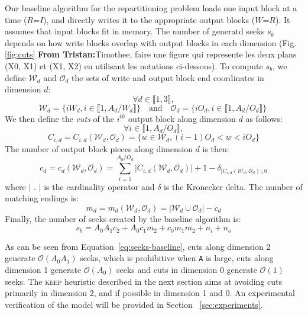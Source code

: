 \documentclass[sigconf, nonacm]{acmart}
\newcommand{\tristan}[1]{\color{orange}\textbf{From Tristan:}#1\color{black}}
\newcommand{\keep}[0]{\textsc{keep}\xspace}
\begin{document}
Our baseline algorithm for the repartitioning problem loads one input block
at a time ($R$=$I$), and directly writes it to the appropriate output
blocks ($W$=$R$). It assumes that input blocks fit in memory. The number of
generatd seeks $s_b$
depends on how write blocks overlap with
output blocks in each dimension (Fig.\ref{fig:cuts} \tristan{Timothee, faire une figure 
qui represente les deux plans (X0, X1) et (X1, X2) en utilisant les notations ci-dessous}). To compute $s_b$, we define
$\mathcal{W}_d$ and $\mathcal{O}_d$ the sets of write and output block end
coordinates in dimension $d$:
\[
  \forall d \in \llbracket 1, 3 \rrbracket,
\]
\begin{equation}
  \mathcal{W}_d = \Big\{ iW_d, i \in \llbracket 1, A_d/W_d \rrbracket \Big\} \quad \mathrm{and} \quad
  \mathcal{O}_d = \Big\{ iO_d, i \in \llbracket 1, A_d/O_d \rrbracket \Big\} ~\label{eq:baseline-blocks}
\end{equation}
We then define the \emph{cuts} of the $i^{th}$ output block along dimension
$d$ as follows:
\[
  \forall i \in \llbracket 1, A_d/O_d \rrbracket,
\]
\[
  C_{i, d} = C_{i, d}\left(  \mathcal{W}_d, \mathcal{O}_d \right) = \Big\{ w \in \mathcal{W}_d, (i-1)O_d < w < iO_d \Big\}
\]
The number of output block pieces along dimension $d$ is then:
\[
  c_d = c_d\left(  \mathcal{W}_d, \mathcal{O}_d \right) =
               \sum_{i=1}^{A_d/O_d} \vert C_{i, d}\left(  \mathcal{W}_d, \mathcal{O}_d \right) \vert + 1 - \delta_{\vert C_{i, d}\left(  \mathcal{W}_d, \mathcal{O}_d \right) \vert, 0}
\]
where $\vert$ . $\vert$ is the cardinality operator and $\delta$ is the Kronecker delta. 
The number of matching endings is:
\[
  m_d = m_d\left(  \mathcal{W}_d, \mathcal{O}_d \right) = \vert \mathcal{W}_d \cup  \mathcal{O}_d \vert  - c_d
  \]
Finally, the number of seeks created by the baseline algorithm is:
\begin{equation}
  s_b = A_0 A_1 c_2 + 
      A_0 c_1 m_2 +
      c_0 m_1 m_2
       + n_i + n_o \label{eq:seeks-baseline}
\end{equation}


As can be seen from Equation~\ref{eq:seeks-baseline}, cuts along dimension 2 generate $\mathcal{O}(A_0 A_1)$
seeks, which is prohibitive when \texttt{A} is large, cuts along dimension 1 generate $\mathcal{O}(A_0)$ seeks and cuts in
dimension 0 generate $\mathcal{O}(1)$ seeks. The \keep heuristic described
in the next section aims at avoiding cuts primarily in dimension 2, and if
possible in dimension 1 and 0. An experimental verification of the model will be provided in 
Section ~\ref{sec:experiments}.
\end{document}
